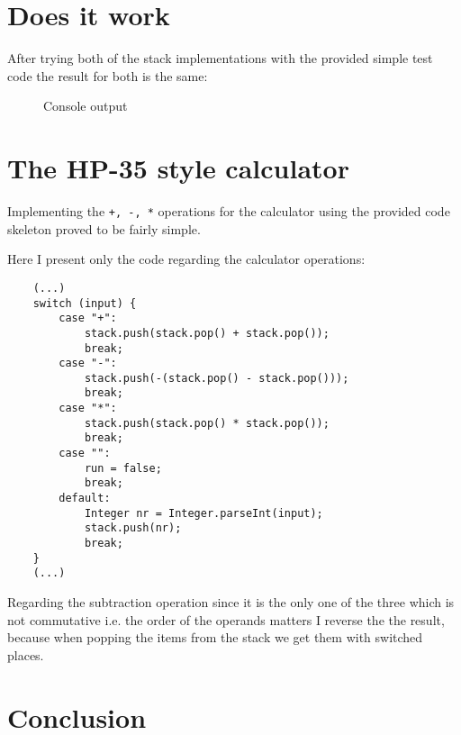 \documentclass[a4paper,11pt]{article}
\begin{document}
\section*{Does it work}

After trying both of the stack implementations with the provided simple test code the result for both is the same:
\begin{figure}[H]
    \noindent{}
    \caption{Console output\label{fig:out}}
\end{figure}


\section*{The HP-35 style calculator}
Implementing the {\tt +, -, *} operations for the calculator using the provided code skeleton proved to be fairly simple. 

Here I present only the code regarding the calculator operations:

\begin{verbatim}
    (...)
    switch (input) {
        case "+":
            stack.push(stack.pop() + stack.pop());
            break;
        case "-":
            stack.push(-(stack.pop() - stack.pop()));
            break;
        case "*":
            stack.push(stack.pop() * stack.pop());
            break;
        case "":
            run = false;
            break;
        default:
            Integer nr = Integer.parseInt(input);
            stack.push(nr);
            break;
    }
    (...)

\end{verbatim}
Regarding the subtraction operation since it is the only one of the three which is not commutative i.e. the order of the operands matters I reverse the the result, because when popping the items from the stack we get them with switched places.

\section*{Conclusion}
\end{document}
